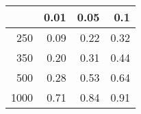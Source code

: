 % 
\begin{tabular}{rrrr}
  \hline
 & 0.01 & 0.05 & 0.1 \\ 
  \hline
250 & 0.09 & 0.22 & 0.32 \\ 
  350 & 0.20 & 0.31 & 0.44 \\ 
  500 & 0.28 & 0.53 & 0.64 \\ 
  1000 & 0.71 & 0.84 & 0.91 \\ 
   \hline
\end{tabular}
